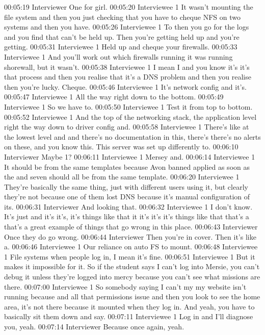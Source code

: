 00:05:19 Interviewer
One for girl.
00:05:20 Interviewee 1
It wasn't mounting the file system and then you just checking that you have to cheque NFS on two systems and then you have.
00:05:26 Interviewee 1
To then you go for the logs and you find that can't be held up. Then you're getting held up and you're getting.
00:05:31 Interviewee 1
Held up and cheque your firewalls.
00:05:33 Interviewee 1
And you'll work out which firewalls running it was running shorewall, but it wasn't.
00:05:38 Interviewee 1
I mean I and you know it's it's that process and then you realise that it's a DNS problem and then you realise then you're lucky. Cheque.
00:05:46 Interviewee 1
It's network config and it's.
00:05:47 Interviewee 1
All the way right down to the bottom.
00:05:49 Interviewee 1
So we have to.
00:05:50 Interviewee 1
Test it from top to bottom.
00:05:52 Interviewee 1
And the top of the networking stack, the application level right the way down to driver config and.
00:05:58 Interviewee 1
There's like at the lowest level and and there's no documentation in this, there's there's no alerts on these, and you know this. This server was set up differently to.
00:06:10 Interviewer
Maybe 1?
00:06:11 Interviewee 1
Mersey and.
00:06:14 Interviewee 1
It should be from the same templates because Avon banned applied as soon as the and seven should all be from the same template.
00:06:20 Interviewee 1
They're basically the same thing, just with different users using it, but clearly they're not because one of them lost DNS because it's manual configuration of its.
00:06:31 Interviewer
And looking that.
00:06:32 Interviewee 1
I don't know. It's just and it's it's, it's things like that it it's it's it's things like that that's a that's a great example of things that go wrong in this place.
00:06:43 Interviewer
Once they do go wrong.
00:06:44 Interviewer
Then you're in cover. Then it's like a.
00:06:46 Interviewee 1
Our reliance on auto FS to mount.
00:06:48 Interviewee 1
File systems when people log in, I mean it's fine.
00:06:51 Interviewee 1
But it makes it impossible for it. So if the student says I can't log into Mersie, you can't debug it unless they're logged into mercy because you can't see what missions are there.
00:07:00 Interviewee 1
So somebody saying I can't my my website isn't running because and all that permissions issue and then you look to see the home area, it's not there because it mounted when they log in. And yeah, you have to basically sit them down and say.
00:07:11 Interviewee 1
Log in and I'll diagnose you, yeah.
00:07:14 Interviewer
Because once again, yeah.
